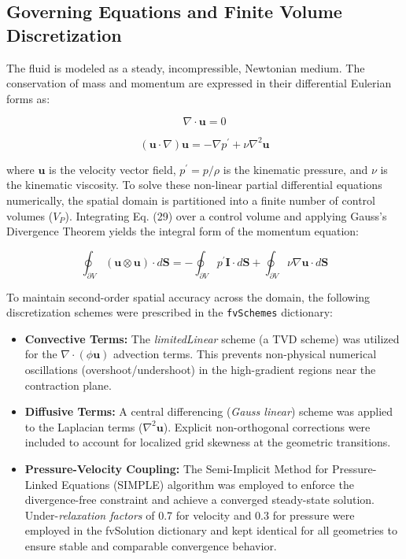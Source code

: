 \documentclass[12pt, a4paper]{article}
\begin{document}
\subsection{Governing Equations and Finite Volume Discretization}
The fluid is modeled as a steady, incompressible, Newtonian medium. The conservation of mass and momentum are expressed in their differential Eulerian forms as:

\begin{equation}
	\nabla \cdot \mathbf{u} = 0
\end{equation}

\begin{equation}
	(\mathbf{u} \cdot \nabla)\mathbf{u} = -\nabla p^{\prime} + \nu \nabla^{2} \mathbf{u}
\end{equation}

where $\mathbf{u}$ is the velocity vector field, $p^{\prime} = p/\rho$ is the kinematic pressure, and $\nu$ is the kinematic viscosity. To solve these non-linear partial differential equations numerically, the spatial domain is partitioned into a finite number of control volumes ($V_P$)\cite{versteeg2007}. Integrating Eq. (29) over a control volume and applying Gauss's Divergence Theorem yields the integral form of the momentum equation:

\begin{equation}
	\oint_{\partial V} (\mathbf{u} \otimes \mathbf{u}) \cdot d\mathbf{S} = -\oint_{\partial V} p^{\prime} \mathbf{I} \cdot d\mathbf{S} + \oint_{\partial V} \nu \nabla \mathbf{u} \cdot d\mathbf{S}
\end{equation}

To maintain second-order spatial accuracy across the domain, the following discretization schemes were prescribed in the \texttt{fvSchemes} dictionary:
\begin{itemize}
	\item \textbf{Convective Terms:} The \textit{limitedLinear} scheme (a TVD scheme) was utilized for the $\nabla \cdot (\phi \mathbf{u})$ advection terms. This prevents non-physical numerical oscillations (overshoot/undershoot) in the high-gradient regions near the contraction plane.
	\item \textbf{Diffusive Terms:} A central differencing (\textit{Gauss linear}) scheme was applied to the Laplacian terms ($\nabla^2 \mathbf{u}$). Explicit non-orthogonal corrections were included to account for localized grid skewness at the geometric transitions.
	\item \textbf{Pressure-Velocity Coupling:} The Semi-Implicit Method for Pressure-Linked Equations (SIMPLE) algorithm was employed to enforce the divergence-free constraint and achieve a converged steady-state solution. Under-\textit{relaxation factors} of 0.7 for velocity and 0.3 for pressure were employed in the fvSolution dictionary and kept identical for all geometries to ensure stable and comparable convergence behavior.
\end{itemize}
\end{document}
